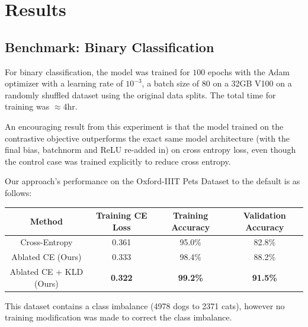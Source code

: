\documentclass{article}
\theoremstyle{plain}
\theoremstyle{definition}
\theoremstyle{remark}
\begin{document}
\section{Results}

\subsection{Benchmark: Binary Classification}

For binary classification, the model was trained for $100$ epochs with the Adam optimizer with a learning rate of $10^{-3}$, a batch size of $80$ on a 32GB V100 on a randomly shuffled dataset using the original data splits. The total time for training was $\approx$4hr.

An encouraging result from this experiment is that the model trained on the contrastive objective outperforms the exact same model architecture (with the final bias, batchnorm and ReLU re-added in) on cross entropy loss, even though the control case was trained explicitly to reduce cross entropy.

Our approach's performance on the Oxford-IIIT Pets Dataset to the default is as follows:

\begin{table}[h]
	\centering
	\begin{tabular}{c|ccc}
		\toprule
		\textbf{Method}  & \textbf{Training CE Loss}  & \textbf{Training Accuracy}   & \textbf{Validation Accuracy} \\
		\midrule
		Cross-Entropy & 0.361 & 95.0\% & 82.8\% \\
		Ablated CE (Ours) & 0.333 & 98.4\% & 88.2\% \\
		Ablated CE + KLD (Ours) & \bf 0.322 & \bf 99.2\% & \bf 91.5\% \\
		\bottomrule
	\end{tabular}
\end{table}

This dataset contains a class imbalance (4978 dogs to 2371 cats), however no training modification was made to correct the class imbalance.
\end{document}

